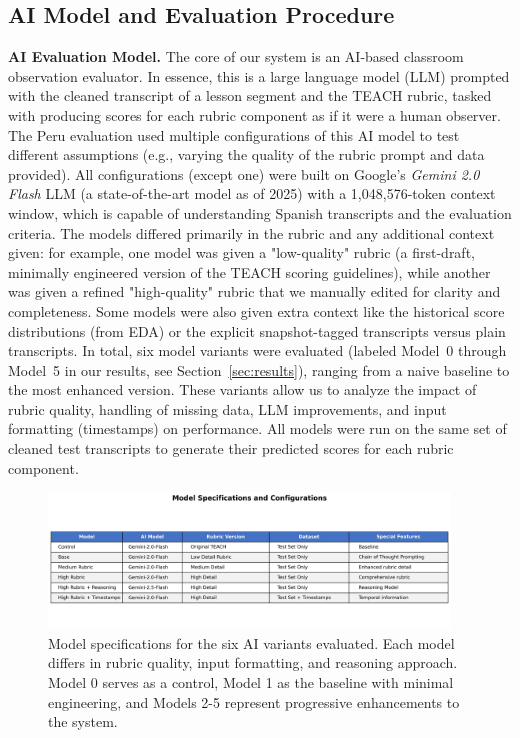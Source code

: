 \documentclass[12pt]{article}
\begin{document}
\subsection{AI Model and Evaluation Procedure}
\noindent \textbf{AI Evaluation Model.} The core of our system is an AI-based classroom observation evaluator. In essence, this is a large language model (LLM) prompted with the cleaned transcript of a lesson segment and the TEACH rubric, tasked with producing scores for each rubric component as if it were a human observer. The Peru evaluation used multiple configurations of this AI model to test different assumptions (e.g., varying the quality of the rubric prompt and data provided). All configurations (except one) were built on Google's \textit{Gemini 2.0 Flash} LLM (a state-of-the-art model as of 2025) with a 1,048,576-token context window, which is capable of understanding Spanish transcripts and the evaluation criteria. The models differed primarily in the rubric and any additional context given: for example, one model was given a "low-quality" rubric (a first-draft, minimally engineered version of the TEACH scoring guidelines), while another was given a refined "high-quality" rubric that we manually edited for clarity and completeness. Some models were also given extra context like the historical score distributions (from EDA) or the explicit snapshot-tagged transcripts versus plain transcripts. In total, six model variants were evaluated (labeled Model~0 through Model~5 in our results, see Section~\ref{sec:results}), ranging from a naive baseline to the most enhanced version. These variants allow us to analyze the impact of rubric quality, handling of missing data, LLM improvements, and input formatting (timestamps) on performance. All models were run on the same set of cleaned test transcripts to generate their predicted scores for each rubric component.

\begin{figure}[H]\centering
\includegraphics[width=0.95\textwidth]{model_specifications_table.png}
\caption{Model specifications for the six AI variants evaluated. Each model differs in rubric quality, input formatting, and reasoning approach. Model 0 serves as a control, Model 1 as the baseline with minimal engineering, and Models 2-5 represent progressive enhancements to the system.}
\label{fig:model-specs}
\end{figure}
\end{document}
